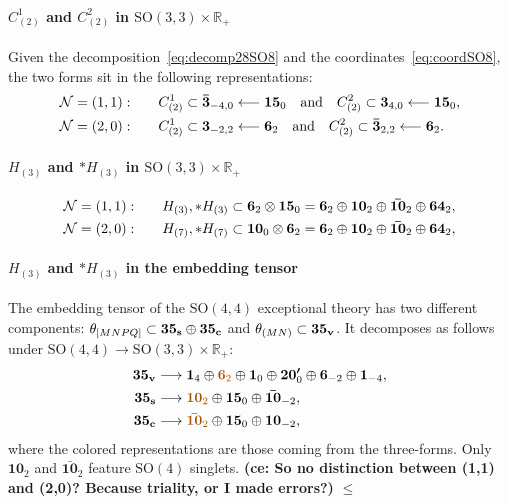 \documentclass[11pt]{article}
\newcommand{\SO}{\ensuremath{\mathrm{SO}}\xspace}
\newcommand{\R}{\ensuremath{\mathbb{R}}\xspace}
\newcommand{\ce}[1]{\marginpar{\parbox{\marginparwidth}{\boldmath $\Longleftarrow$}}
{\boldmath\bfseries (ce: #1)}}
\begin{document}
\paragraph{\boldmath $C_{(2)}^{1}$ and $C_{(2)}^{2}$ in $\SO(3,3)\times\R_{+}$} Given the decomposition~\eqref{eq:decomp28SO8} and the coordinates~\eqref{eq:coordSO8}, the two forms sit in the following representations:
\begin{equation}
  \begin{aligned}
    {\cal N}=(1,1):&\qquad C^{1}_{(2)}\subset\bm{\bar{3}}_{-4,0} \longleftarrow\bm{15}_{0}\quad{\rm and}\quad C^{2}_{(2)}\subset\bm{3}_{4,0} \longleftarrow\bm{15}_{0},\\
    {\cal N}=(2,0):&\qquad C^{1}_{(2)}\subset\bm{3}_{-2,2} \longleftarrow\bm{6}_{2}\quad{\rm and}\quad C^{2}_{(2)}\subset\bm{\bar{3}}_{2,2} \longleftarrow\bm{6}_{2}.
  \end{aligned}
\end{equation}

\paragraph{\boldmath $H_{(3)}$ and $*H_{(3)}$ in $\SO(3,3)\times\R_{+}$}
\begin{equation}
  \begin{aligned}
    {\cal N}=(1,1):&\qquad H_{(3)},*H_{(3)} \subset\bm{6}_{2}\otimes\bm{15}_{0}=\bm{6}_{2}\oplus\bm{10}_{2}\oplus\bm{\bar{10}}_{2}\oplus\bm{64}_{2},\\
    {\cal N}=(2,0):&\qquad H_{(7)},*H_{(7)} \subset\bm{10}_{0}\otimes\bm{6}_{2}=\bm{6}_{2}\oplus\bm{10}_{2}\oplus\bm{\bar{10}}_{2}\oplus\bm{64}_{2},
  \end{aligned}
\end{equation}

\paragraph{\boldmath $H_{(3)}$ and $*H_{(3)}$ in the embedding tensor} The embedding tensor of the $\SO(4,4)$ exceptional theory has two different components: $\theta_{[MNPQ]}\subset\bm{35_{\rm s}}\oplus\bm{35_{\rm c}}$ and $\theta_{(MN)}\subset\bm{35_{\rm v}}$. It decomposes as follows under $\SO(4,4)\rightarrow\SO(3,3)\times\R_{+}$:
\begin{equation}
  \begin{aligned}
    \bm{35_{\rm v}} &\longrightarrow \bm{1}_{4} \oplus {\color{mydarkorange}\bm{6}_{2}} \oplus \bm{1}_{0} \oplus \bm{20'}_{0} \oplus \bm{6}_{-2} \oplus \bm{1}_{-4},\\
    \bm{35_{\rm s}} &\longrightarrow {\color{mydarkorange}\bm{10}_{2}} \oplus \bm{15}_{0}  \oplus \bm{\bar{10}}_{-2},\\
    \bm{35_{\rm c}} &\longrightarrow {\color{mydarkorange}\bm{\bar{10}}_{2}} \oplus \bm{15}_{0}  \oplus \bm{10}_{-2},
  \end{aligned}
\end{equation}
where the colored representations are those coming from the three-forms. Only $\bm{10}_{2}$ and $\bm{\bar{10}}_{2}$ feature $\SO(4)$ singlets. \ce{So no distinction between (1,1) and (2,0)? Because triality, or I made errors?} $\leq$


\end{document}

